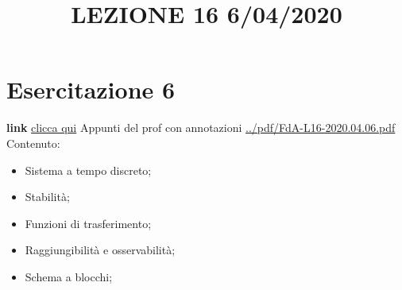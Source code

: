 \section{Esercitazione 6}
\title{LEZIONE 16 6/04/2020}\newline
\textbf{link} \href{https://web.microsoftstream.com/video/0384d9d2-5ddc-4381-8933-f46dc8fca4d3?list=user&userId=faa91214-a6f5-40d7-8875-253fd49b8ce1}{clicca qui}\newline
\newline
Appunti del prof con annotazioni \url{../pdf/FdA-L16-2020.04.06.pdf}\newline
Contenuto:
\begin{itemize}
    \item Sistema a tempo discreto;
    \item Stabilità;
    \item Funzioni di trasferimento;
    \item Raggiungibilità e osservabilità;
    \item Schema a blocchi;
\end{itemize}